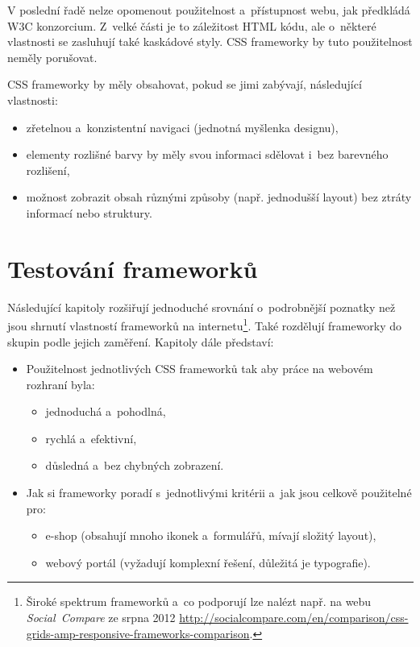 \documentclass[thesis=B,czech]{FITthesis}[2012/06/26]
\begin{document}
V poslední řadě nelze opomenout použitelnost a~přístupnost webu, jak předkládá \gls{W3C} konzorcium. Z~velké části je to záležitost \gls{HTML} kódu, ale o~některé vlastnosti se zasluhují také kaskádové styly. \gls{CSS} frameworky by tuto použitelnost neměly porušovat. 

\gls{CSS} frameworky by měly obsahovat, pokud se jimi zabývají, následující vlastnosti:
\begin{itemize}
 	\item zřetelnou a~konzistentní navigaci (jednotná myšlenka designu),
 	\item elementy rozlišné barvy by měly svou informaci sdělovat i~bez barevného rozlišení,
 	\item možnost zobrazit obsah různými způsoby (např. jednodušší layout) bez ztráty informací nebo struktury.\cite{wcag}
\end{itemize}


\chapter{Testování frameworků}
Následující kapitoly rozšiřují jednoduché srovnání o~podrobnější poznatky než jsou shrnutí vlastností frameworků na internetu\footnote{Široké spektrum frameworků a~co podporují lze nalézt např. na webu \textit{Social~Compare} ze srpna 2012 \url{http://socialcompare.com/en/comparison/css-grids-amp-responsive-frameworks-comparison}.}. Také rozdělují frameworky  do skupin podle jejich zaměření. 
Kapitoly dále představí:

\begin{itemize}
  \item Použitelnost jednotlivých \gls{CSS} frameworků tak aby práce na webovém rozhraní byla:
	\begin{itemize}
 	\item jednoduchá a~pohodlná,
 	\item rychlá a~efektivní,
 	\item důsledná a~bez chybných zobrazení.
	\end{itemize}

 \item Jak si frameworky poradí s~jednotlivými kritérii a~jak jsou celkově použitelné pro:

\begin{itemize}
 \item e-shop (obsahují mnoho ikonek a~formulářů, mívají složitý layout),
 \item webový portál (vyžadují komplexní řešení, důležitá je typografie).
\end{itemize}
\end{itemize}
\end{document}
